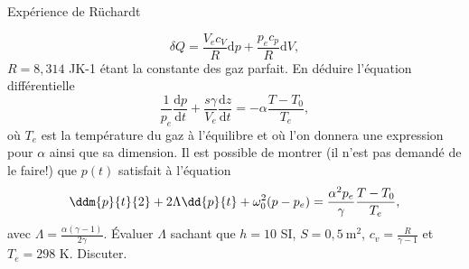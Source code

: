 \begin{exo}[PC][2]{Expérience de Rüchardt}
\begin{quest}
\begin{equation}
\delta Q = \dfrac{V_e c_V}{R} \mathrm{d} p + \dfrac{p_e c_p}{R} \mathrm{d} V,
\end{equation}
$R=8,314$ {J}{}{K}{-1} étant la constante des gaz parfait. En déduire l'équation différentielle
\begin{equation}
\dfrac{1}{p_e} \dfrac{\mathrm{d} p}{\mathrm{d}t} + \dfrac{s \gamma}{V_e}  \dfrac{\mathrm{d} z}{\mathrm{d}t}  = -\alpha \dfrac{T-T_0}{T_e},
\end{equation}
où $T_e$ est la température du gaz à l'équilibre et où l'on donnera une expression pour $\alpha$ ainsi que sa dimension. Il est possible de montrer (il n'est pas demandé de le faire!) que $p(t)$ satisfait à l'équation
\begin{equation}
\ddm{p}{t}{2} + 2 \Lambda \dd{p}{t} + \omega_0^2 (p-p_e) = \dfrac{\alpha^2 p_e}{\gamma} \dfrac{T-T_0}{T_e},
\end{equation}
avec $\Lambda = \frac{\alpha (\gamma-1)}{2 \gamma}$. Évaluer $\Lambda$ sachant que $h = 10$ SI, $S=0,5 ~\text{m}^2$, $c_v = \frac{R}{\gamma-1}$ et $T_e = 298$ K. Discuter.
\end{quest}
\end{exo}


